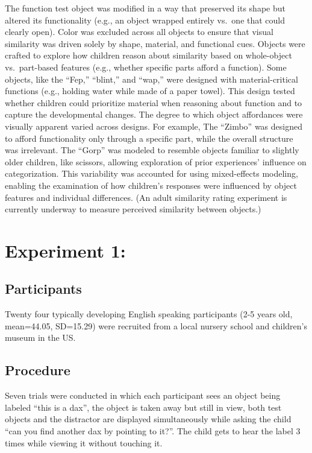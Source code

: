 \documentclass[10pt, letterpaper]{article}
\begin{document}
The function test object was modified in a way that preserved its shape
but altered its functionality (e.g., an object wrapped entirely vs.~one
that could clearly open). Color was excluded across all objects to
ensure that visual similarity was driven solely by shape, material, and
functional cues. Objects were crafted to explore how children reason
about similarity based on whole-object vs.~part-based features (e.g.,
whether specific parts afford a function). Some objects, like the
``Fep,'' ``blint,'' and ``wap,'' were designed with material-critical
functions (e.g., holding water while made of a paper towel). This design
tested whether children could prioritize material when reasoning about
function and to capture the developmental changes. The degree to which
object affordances were visually apparent varied across designs. For
example, The ``Zimbo'' was designed to afford functionality only through
a specific part, while the overall structure was irrelevant. The
``Gorp'' was modeled to resemble objects familiar to slightly older
children, like scissors, allowing exploration of prior experiences'
influence on categorization. This variability was accounted for using
mixed-effects modeling, enabling the examination of how children's
responses were influenced by object features and individual differences.
(An adult similarity rating experiment is currently underway to measure
perceived similarity between objects.)

\hypertarget{experiment-1}{%
\section{Experiment 1:}\label{experiment-1}}

\hypertarget{participants}{%
\subsection{Participants}\label{participants}}

Twenty four typically developing English speaking participants (2-5
years old, mean=44.05, SD=15.29) were recruited from a local nursery
school and children's museum in the US.

\hypertarget{procedure}{%
\subsection{Procedure}\label{procedure}}

Seven trials were conducted in which each participant sees an object
being labeled ``this is a dax'', the object is taken away but still in
view, both test objects and the distractor are displayed simultaneously
while asking the child ``can you find another dax by pointing to it?''.
The child gets to hear the label 3 times while viewing it without
touching it.
\end{document}
